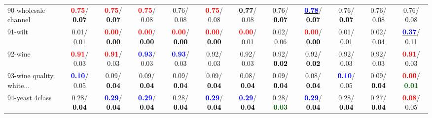 \begin{table}[h]
\begin{center}
{\begin{tabular}{lc|c|c|c|c|c|c|c|c|c|c}
90-wholesale channel & \textcolor{red}{\textbf{  0.75}}/\textcolor{black}{\textbf{  0.07}} & \textcolor{red}{\textbf{  0.75}}/\textcolor{black}{\textbf{  0.07}} & \textcolor{red}{\textbf{  0.75}}/  0.08 &   0.76/  0.08 & \textcolor{red}{\textbf{  0.75}}/  0.08 & \textcolor{black}{\textbf{  0.77}}/  0.08 &   0.76/\textcolor{black}{\textbf{  0.07}} & \underline{\textcolor{blue}{\textbf{  0.78}}}/\textcolor{black}{\textbf{  0.07}} &   0.76/\textcolor{black}{\textbf{  0.07}} &   0.76/  0.08 &   0.76/  0.08 \\
91-wilt &   0.01/  0.01 & \textcolor{red}{\textbf{  0.00}}/\textcolor{black}{\textbf{  0.00}} & \textcolor{red}{\textbf{  0.00}}/\textcolor{black}{\textbf{  0.00}} & \textcolor{red}{\textbf{  0.00}}/\textcolor{black}{\textbf{  0.00}} & \textcolor{red}{\textbf{  0.00}}/\textcolor{black}{\textbf{  0.00}} & \textcolor{red}{\textbf{  0.00}}/  0.01 &   0.02/  0.06 & \textcolor{red}{\textbf{  0.00}}/\textcolor{black}{\textbf{  0.00}} &   0.01/  0.01 &   0.02/  0.04 & \underline{\textcolor{blue}{\textbf{  0.37}}}/  0.11 \\
92-wine & \textcolor{red}{\textbf{  0.91}}/  0.03 & \textcolor{red}{\textbf{  0.91}}/  0.03 & \textcolor{blue}{\textbf{  0.93}}/  0.03 & \textcolor{blue}{\textbf{  0.93}}/  0.03 &   0.92/  0.03 &   0.92/  0.03 &   0.92/\textcolor{black}{\textbf{  0.02}} &   0.92/\textcolor{black}{\textbf{  0.02}} &   0.92/  0.03 &   0.92/  0.03 & \textcolor{red}{\textbf{  0.91}}/  0.03 \\ \hline
93-wine quality white... & \textcolor{blue}{\textbf{  0.10}}/  0.05 &   0.09/\textcolor{black}{\textbf{  0.04}} &   0.09/\textcolor{black}{\textbf{  0.04}} &   0.09/\textcolor{black}{\textbf{  0.04}} &   0.09/\textcolor{black}{\textbf{  0.04}} &   0.08/\textcolor{black}{\textbf{  0.04}} &   0.09/\textcolor{black}{\textbf{  0.04}} &   0.08/\textcolor{black}{\textbf{  0.04}} & \textcolor{blue}{\textbf{  0.10}}/  0.05 &   0.09/\textcolor{black}{\textbf{  0.04}} & \textcolor{red}{\textbf{  0.00}}/\textcolor{darkgreen}{\textbf{  0.01}} \\
94-yeast 4class &   0.28/\textcolor{black}{\textbf{  0.04}} & \textcolor{blue}{\textbf{  0.29}}/\textcolor{black}{\textbf{  0.04}} & \textcolor{blue}{\textbf{  0.29}}/\textcolor{black}{\textbf{  0.04}} &   0.28/\textcolor{black}{\textbf{  0.04}} & \textcolor{blue}{\textbf{  0.29}}/\textcolor{black}{\textbf{  0.04}} & \textcolor{blue}{\textbf{  0.29}}/\textcolor{black}{\textbf{  0.04}} &   0.28/\textcolor{darkgreen}{\textbf{  0.03}} & \textcolor{blue}{\textbf{  0.29}}/\textcolor{black}{\textbf{  0.04}} &   0.28/\textcolor{black}{\textbf{  0.04}} &   0.27/\textcolor{black}{\textbf{  0.04}} & \textcolor{red}{\textbf{  0.08}}/  0.05 \\\end{tabular}}\label{stratsALCKappa2aNBRedux}
\end{center}
\end{table}
